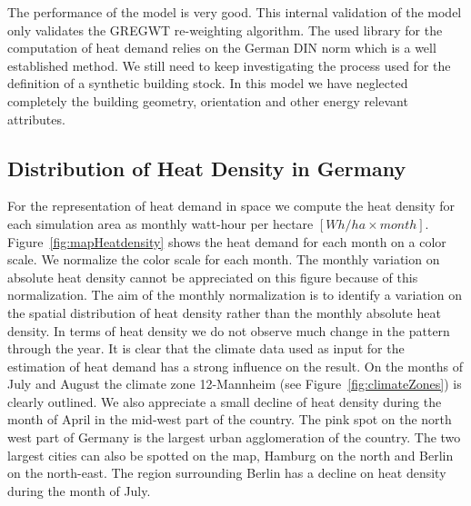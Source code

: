 \documentclass[runningheads,a4paper]{llncs}
\begin{document}
The performance of the model is very good. This internal validation of the
model only validates the GREGWT re-weighting algorithm. The used library
for the computation of heat demand relies on the German DIN norm which is a
well established method. We still need to keep investigating the process used
for the definition of a synthetic building stock. In this model we have
neglected completely the building geometry, orientation and other energy
relevant attributes.
\\

\subsection{Distribution of Heat Density in Germany}

For the representation of heat demand in space we compute the heat density for
each simulation area as monthly watt-hour per hectare $[Wh/ha \times month]$.
Figure~\ref{fig:mapHeatdensity} shows the heat demand for each month on a
color scale. 
We normalize the color scale for each month. The monthly variation on absolute
heat density cannot be appreciated on this figure because of this
normalization. The aim of the monthly normalization is to identify a variation
on the spatial distribution of heat density  rather than the monthly absolute heat
density.
In terms of heat density we do not observe much change in the pattern through the
year. It is clear that the climate data used as input for the estimation of
heat demand has a strong influence on the result. On the months of July and
August the climate zone 12-Mannheim (see Figure~\ref{fig:climateZones}) is
clearly outlined.
We also appreciate a small decline of heat density during the month of April
in the mid-west part of the country.
The pink spot on the north west part of Germany is the largest urban
agglomeration of the country. The two largest cities can also be spotted on the
map, Hamburg on the north and Berlin on the north-east.
The region surrounding Berlin has a decline on heat density during the month
of July.
\\
\end{document}
